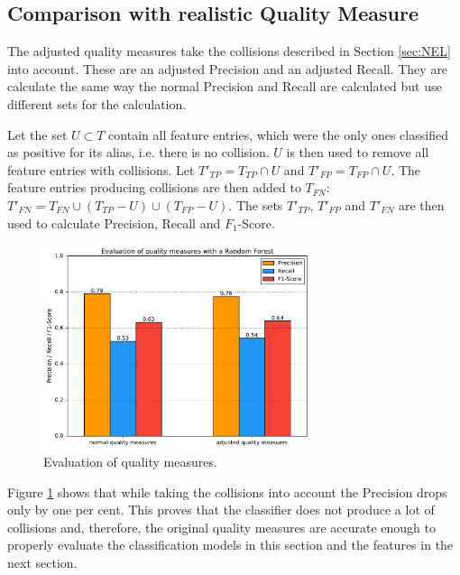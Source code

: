 \subsection{Comparison with realistic Quality Measure}
The adjusted quality measures take the collisions described in Section \ref{sec:NEL} into account. These are an adjusted Precision and an adjusted Recall. They are calculate the same way the normal Precision and Recall are calculated but use different sets for the calculation.\par
Let the set $U \subset T$ contain all feature entries, which were the only ones classified as positive for its alias, i.e. there is no collision. $U$ is then used to remove all feature entries with collisions. Let $T'_{TP} = T_{TP} \cap U$ and $T'_{FP} = T_{FP} \cap U$. The feature entries producing collisions are then added to $T_{FN}$: $T'_{FN} = T_{FN} \cup (T_{TP} - U) \cup (T_{FP} - U)$. The sets $T'_{TP}$, $T'_{FP}$ and $T'_{FN}$ are then used to calculate Precision, Recall and $F_1$-Score.\par
\begin{figure}[H]
	\centering
	\includegraphics[width=0.7\textwidth]{img/qualitymeasure_eval}
	\caption{Evaluation of quality measures.}
	\label{qualitymeasure_eval}
\end{figure}
Figure \ref{qualitymeasure_eval} shows that while taking the collisions into account the Precision drops only by one per cent. This proves that the classifier does not produce a lot of collisions and, therefore, the original quality measures are accurate enough to properly evaluate the classification models in this section and the features in the next section.

